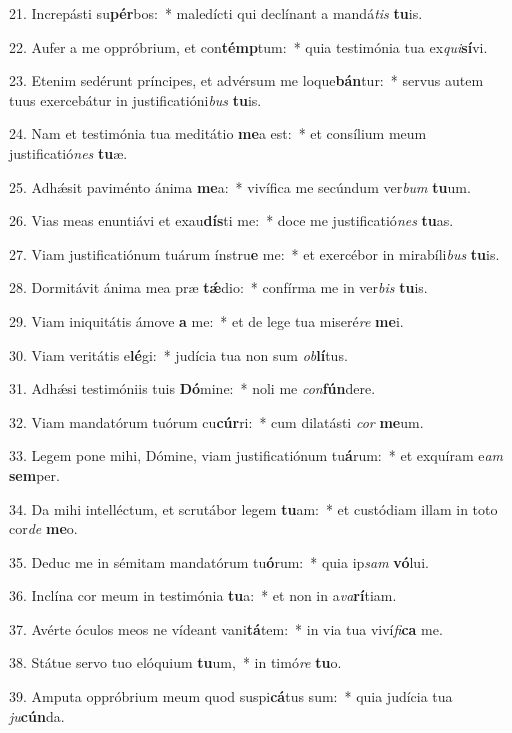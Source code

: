 21. Increpásti su\textbf{pér}bos:~*  maledícti qui declínant a mandá\textit{tis} \textbf{tu}is.\

22. Aufer a me oppróbrium, et con\textbf{témp}tum:~*  quia testimónia tua ex\textit{qui}\textbf{sí}vi.\

23. Etenim sedérunt príncipes, et advérsum me loque\textbf{bán}tur:~*  servus autem tuus exercebátur in justificatióni\textit{bus} \textbf{tu}is.\

24. Nam et testimónia tua meditátio \textbf{me}a est:~*  et consílium meum justificatió\textit{nes} \textbf{tu}æ.\

25. Adhǽsit paviménto ánima \textbf{me}a:~*  vivífica me secúndum ver\textit{bum} \textbf{tu}um.\

26. Vias meas enuntiávi et exau\textbf{dís}ti me:~*  doce me justificatió\textit{nes} \textbf{tu}as.\

27. Viam justificatiónum tuárum ínstru\textbf{e} me:~*  et exercébor in mirabíli\textit{bus} \textbf{tu}is.\

28. Dormitávit ánima mea præ \textbf{tǽ}dio:~*  confírma me in ver\textit{bis} \textbf{tu}is.\

29. Viam iniquitátis ámove \textbf{a} me:~*  et de lege tua miseré\textit{re} \textbf{me}i.\

30. Viam veritátis e\textbf{lé}gi:~*  judícia tua non sum \textit{ob}\textbf{lí}tus.\

31. Adhǽsi testimóniis tuis \textbf{Dó}mine:~*  noli me \textit{con}\textbf{fún}dere.\

32. Viam mandatórum tuórum cu\textbf{cúr}ri:~*  cum dilatásti \textit{cor} \textbf{me}um.\

33. Legem pone mihi, Dómine, viam justificatiónum tu\textbf{á}rum:~*  et exquíram e\textit{am} \textbf{sem}per.\

34. Da mihi intelléctum, et scrutábor legem \textbf{tu}am:~*  et custódiam illam in toto cor\textit{de} \textbf{me}o.\

35. Deduc me in sémitam mandatórum tu\textbf{ó}rum:~*  quia ip\textit{sam} \textbf{vó}lui.\

36. Inclína cor meum in testimónia \textbf{tu}a:~*  et non in a\textit{va}\textbf{rí}tiam.\

37. Avérte óculos meos ne vídeant vani\textbf{tá}tem:~*  in via tua viví\textit{fi}\textbf{ca} me.\

38. Státue servo tuo elóquium \textbf{tu}um,~*  in timó\textit{re} \textbf{tu}o.\

39. Amputa oppróbrium meum quod suspi\textbf{cá}tus sum:~*  quia judícia tua \textit{ju}\textbf{cún}da.\

